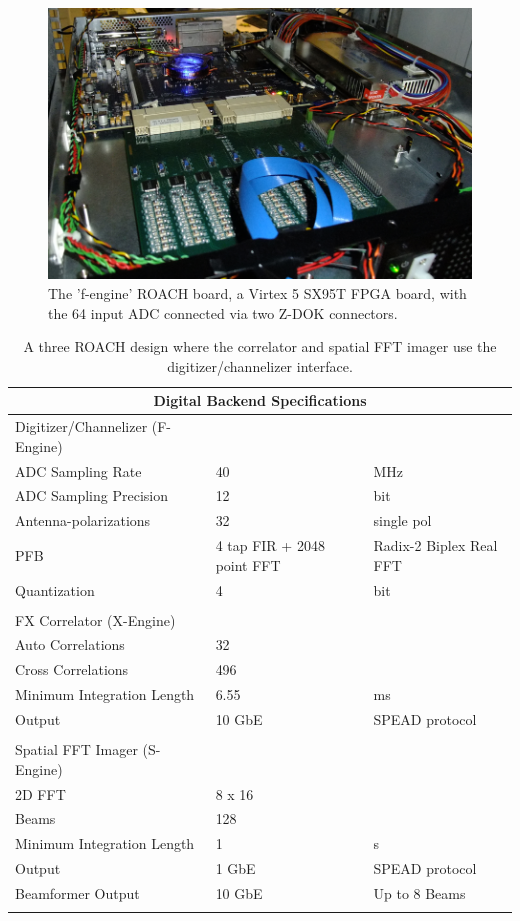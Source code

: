 \documentclass[useAMS,macros,usenatbib,onecolumn]{mn2e}
\begin{document}
\begin{figure}
    \centering
    \includegraphics[scale=0.4]{graphics/roach_feng.png}
    \caption{The 'f-engine' ROACH board, a Virtex 5 SX95T FPGA board, with the 64 input ADC connected via two Z-DOK connectors.}
    \label{fig:roach}
\end{figure}

\begin{table}
\begin{center}
\begin{tabular}{| l | l | l |}
\hline
\multicolumn{3}{|c|}{Digital Backend Specifications}\\
\hline
Digitizer/Channelizer (F-Engine) & &\\
\hline
ADC Sampling Rate	& 40 			& MHz\\
ADC Sampling Precision	& 12 			& bit \\
Antenna-polarizations 	& 32 			& single pol \\
PFB 			& 4 tap FIR + 2048 point FFT	& Radix-2 Biplex Real FFT\\
Quantization 		& 4 			& bit\\
& & \\
\hline
FX Correlator (X-Engine) & &\\
\hline
Auto Correlations 	& 32 			& \\
Cross Correlations 	& 496 			& \\
Minimum Integration Length & 6.55 		& ms\\
Output 			& 10 GbE 		& SPEAD protocol\\
& & \\
\hline
Spatial FFT Imager (S-Engine) & &\\
\hline
2D FFT 			& 8 x 16 		& \\
Beams 			& 128 			& \\
Minimum Integration Length & 1 			& s\\
Output 			& 1 GbE 		& SPEAD protocol\\
Beamformer Output 	& 10 GbE 		& Up to 8 Beams\\
& & \\
\hline
\end{tabular}
\caption{A three ROACH design where the correlator and spatial FFT imager use the digitizer/channelizer interface.}
\label{tbl:digital_specs}
\end{center}
\end{table}
\end{document}
